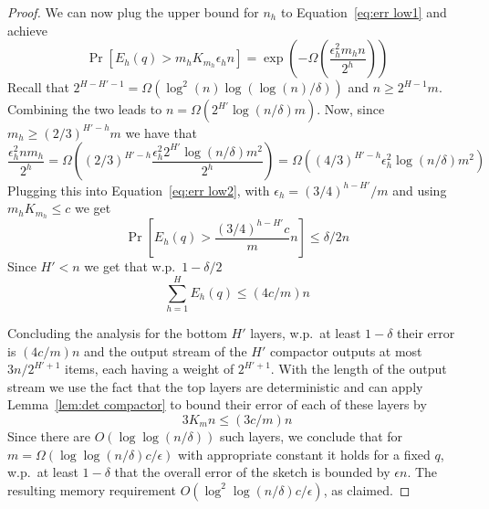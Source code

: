 \documentclass[anon,12pt]{colt2019} %
\newcommand{\eps}{\epsilon}
\renewcommand{\Pr}{\operatorname{Pr}}
\begin{document}
\begin{proof}
We can now plug the upper bound for $n_h$ to Equation~\ref{eq:err low1} and achieve 
\begin{equation} \label{eq:err low2}
\Pr\left[ E_h(q) > m_h K_{m_h} \eps_h n \right] = \exp \left( -\Omega\left( \frac{\eps_h^2 m_h n}{2^h} \right) \right)
\end{equation}
Recall that $2^{H-H'-1} = \Omega(\log^2(n)\log(\log(n)/\delta))$ and $n \geq 2^{H-1}m$. Combining the two leads to $n = \Omega(2^{H'}\log(n/\delta)m)$. Now, since $m_h \geq (2/3)^{H'-h}m$ we have that
$$
\frac{\eps_h^2 n m_h}{2^h} = \Omega\left( (2/3)^{H'-h} \frac{\eps_h^2 2^{H'} \log(n/\delta) m^2}{2^h} \right) = \Omega\left( (4/3)^{H'-h} \eps_h^2 \log(n/\delta) m^2 \right)
$$
Plugging this into Equation~\eqref{eq:err low2}, with $\eps_h = (3/4)^{h-H'}/m$ and using $m_h K_{m_h} \leq c$ we get
\begin{equation} \label{eq:err low3}
\Pr\left[ E_h(q) > \frac{(3/4)^{h-H'} c}{m} n \right]  \leq \delta/2n
\end{equation}
Since $H' < n$ we get that w.p.\ $1-\delta/2$
$$ \sum_{h=1}^H E_h(q) \leq (4c/m) n $$

Concluding the analysis for the bottom $H'$ layers, w.p.\ at least $1-\delta$ their error is $(4c/m) n$ and the output stream of the $H'$ compactor outputs at most $3n/2^{H'+1}$ items, each having a weight of $2^{H'+1}$. With the length of the output stream we use the fact that the top layers are deterministic and can apply Lemma~\ref{lem:det compactor} to bound their error of each of these layers by
$$ 3K_m n \leq (3c/m) n $$
Since there are $O(\log\log(n/\delta))$ such layers, we conclude that for $m=\Omega(\log\log(n/\delta) c/\eps)$ with appropriate constant it holds for a fixed $q$, w.p.\ at least $1-\delta$ that the overall error of the sketch is bounded by $\eps n$. The resulting memory requirement $O(\log^2\log(n/\delta) c/\eps)$, as claimed.



\end{proof}




\end{document}
